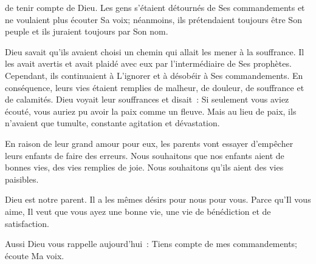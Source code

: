  de tenir compte de Dieu.
 Les gens s'étaient détournés de Ses commandements
 et ne voulaient plus écouter Sa voix; néanmoins, 
 ils prétendaient toujours être Son peuple
 et ils juraient toujours par Son nom. 

Dieu savait qu'ils avaient choisi un chemin
 qui allait les mener à la souffrance.
 Il les avait avertis et avait plaidé avec eux
 par l'intermédiaire de Ses prophètes.
 Cependant, ils continuaient à L'ignorer et à désobéir
 à Ses commandements. En conséquence,
 leurs vies étaient remplies de malheur, de douleur,
 de souffrance et de calamités.
 Dieu voyait leur souffrances et disait~: 
 \og Si seulement vous aviez écouté, vous auriez pu avoir la paix
 comme un fleuve. \fg{} 
 Mais au lieu de paix, ils n'avaient que tumulte,
 constante agitation et dévastation. 


En raison de leur grand amour pour eux,
 les parents vont essayer d'empêcher leurs enfants de faire des erreurs.
 Nous souhaitons que nos enfants aient de bonnes vies,
 des vies remplies de joie.
 Nous souhaitons qu'ils 
 aient des vies paisibles. 

Dieu est notre parent. Il a les mêmes désirs pour nous \ocadr pour vous.
 Parce qu'Il vous aime, Il veut que vous ayez une bonne vie,
 une vie de bénédiction et de satisfaction. 

Aussi Dieu vous rappelle aujourd'hui~: 
 \og Tiens compte de mes commandements; écoute Ma voix. \fg{}

\dvrule








